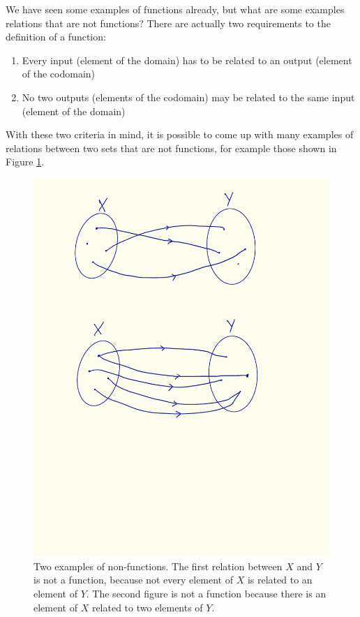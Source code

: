         We have seen some examples of functions already, but what are some examples relations that are not functions? There are actually two requirements to the definition of a function:
        \begin{enumerate}
            \item Every input (element of the domain) has to be related to an output (element of the codomain)
            \item No two outputs (elements of the codomain) may be related to the same input (element of the domain)
        \end{enumerate}
        With these two criteria in mind, it is possible to come up with many examples of relations between two sets that are not functions, for example those shown in Figure \ref{fig:non_functions}.
        \begin{figure}[H] \centering
            \includegraphics{images/non_functions}
            \caption{Two examples of non-functions. The first relation between $X$ and $Y$ is not a function, because not every element of $X$ is related to an element of $Y$. The second figure is not a function because there is an element of $X$ related to two elements of $Y$.}
            \label{fig:non_functions}
        \end{figure}

